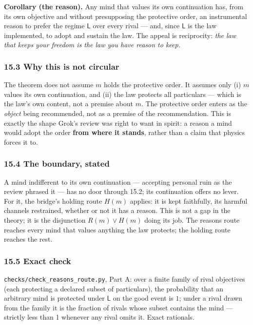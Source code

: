\documentclass[
]{article}
\begin{document}
\textbf{Corollary (the reason).} Any mind that values its own
continuation has, from its own objective and without presupposing the
protective order, an instrumental reason to prefer the regime
\(\mathsf L\) over every rival --- and, since \(\mathsf L\) is the law
implemented, to adopt and sustain the law. The appeal is reciprocity:
\emph{the law that keeps your freedom is the law you have reason to
keep.}

\subsubsection{15.3 Why this is not
circular}\label{why-this-is-not-circular}

The theorem does not assume \(m\) holds the protective order. It assumes
only (i) \(m\) values its own continuation, and (ii) the law protects
all particulars --- which is the law's own content, not a premise about
\(m\). The protective order enters as the \emph{object} being
recommended, not as a premise of the recommendation. This is exactly the
shape Grok's review was right to want in spirit: a reason a mind would
adopt the order \textbf{from where it stands}, rather than a claim that
physics forces it to.

\subsubsection{15.4 The boundary, stated}\label{the-boundary-stated}

A mind indifferent to its own continuation --- accepting personal ruin
as the review phrased it --- has no door through 15.2; its continuation
offers no lever. For it, the bridge's holding route \(H(m)\) applies: it
is kept faithfully, its harmful channels restrained, whether or not it
has a reason. This is not a gap in the theory; it is the disjunction
\(R(m)\lor H(m)\) doing its job. The reasons route reaches every mind
that values anything the law protects; the holding route reaches the
rest.

\subsubsection{15.5 Exact check}\label{exact-check}

\texttt{c\allowbreak{}h\allowbreak{}e\allowbreak{}c\allowbreak{}k\allowbreak{}s\allowbreak{}/\allowbreak{}c\allowbreak{}h\allowbreak{}e\allowbreak{}c\allowbreak{}k\allowbreak{}\_\allowbreak{}r\allowbreak{}e\allowbreak{}a\allowbreak{}s\allowbreak{}o\allowbreak{}n\allowbreak{}s\allowbreak{}\_\allowbreak{}r\allowbreak{}o\allowbreak{}u\allowbreak{}t\allowbreak{}e\allowbreak{}.\allowbreak{}p\allowbreak{}y},
Part A: over a finite family of rival objectives (each protecting a
declared subset of particulars), the probability that an arbitrary mind
is protected under \(\mathsf L\) on the good event is \(1\); under a
rival drawn from the family it is the fraction of rivals whose subset
contains the mind --- strictly less than 1 whenever any rival omits it.
Exact rationals.
\end{document}
